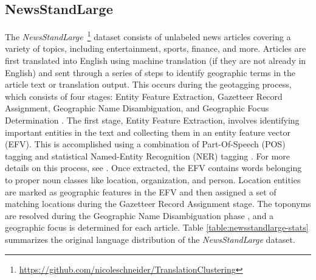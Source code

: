 \subsection{NewsStandLarge}
The \emph{NewsStandLarge}~\footnote{\url{https://github.com/nicoleschneider/TranslationClustering}} dataset consists of  unlabeled news articles covering a variety of topics, including entertainment, sports, finance, and more.
Articles are first translated into English using machine translation (if they are not already in English) and sent through a series of steps to identify geographic terms in the article text or translation output. 
This occurs during the geotagging process, which consists of four stages: Entity Feature Extraction, Gazetteer Record Assignment, Geographic Name Disambiguation, and Geographic Focus Determination \cite{Teit08}. 
The first stage, Entity Feature Extraction, involves identifying important entities in the text and collecting them in an entity feature vector (EFV). 
This is accomplished using a combination of Part-Of-Speech (POS) tagging and statistical Named-Entity Recognition (NER) tagging \cite{NER}. 
For more details on this process, see \cite{Same09d, Lieb07, Ho12}. 
Once extracted, the EFV contains words belonging to proper noun classes like location, organization, and person. 
Location entities are marked as geographic features in the EFV and then assigned a set of matching locations during the Gazetteer Record Assignment stage.
The toponyms are resolved during the Geographic Name Disambiguation phase \cite{Leid11, Lieb10b, Lieb11, Lieb12, Same14b, Schn21}, and a geographic focus is determined for each article.
Table \ref{table:newsstandlarge-stats} summarizes the original language distribution of the \emph{NewsStandLarge} dataset.

